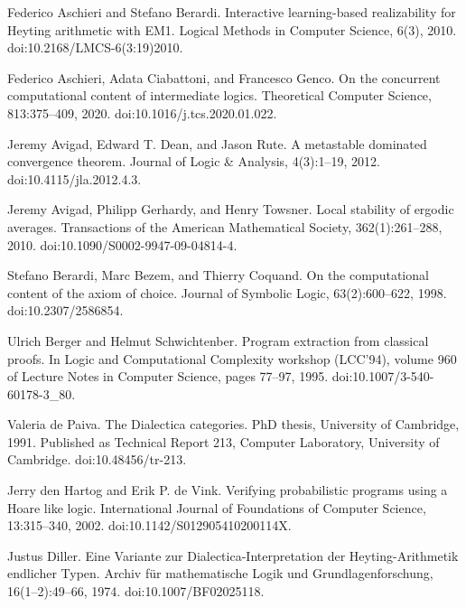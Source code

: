 \documentclass[10pt,a4paper]{article}
\begin{document}
\par\noindent  [2]  Federico Aschieri and Stefano Berardi.  Interactive learning-based realizability for Heyting arithmetic with EM1.  Logical Methods in Computer Science, 6(3), 2010.  doi:10.2168/LMCS-6(3:19)2010.  
 
\par\noindent  [3]  Federico Aschieri, Adata Ciabattoni, and Francesco Genco.  On the concurrent computational content of intermediate logics.  Theoretical Computer Science, 813:375–409, 2020.  doi:10.1016/j.tcs.2020.01.022.  
 
\par\noindent  [4]  Jeremy Avigad, Edward T. Dean, and Jason Rute.  A metastable dominated convergence theorem.  Journal of Logic \& Analysis, 4(3):1–19, 2012.  doi:10.4115/jla.2012.4.3.  
 
\par\noindent  [5]  Jeremy Avigad, Philipp Gerhardy, and Henry Towsner.  Local stability of ergodic averages.  Transactions of the American Mathematical Society, 362(1):261–288, 2010.  doi:10.1090/S0002-9947-09-04814-4.  
 
\par\noindent  [6]  Stefano Berardi, Marc Bezem, and Thierry Coquand.  On the computational content of the axiom of choice.  Journal of Symbolic Logic, 63(2):600–622, 1998.  doi:10.2307/2586854.  
 
\par\noindent  [7]  Ulrich Berger and Helmut Schwichtenber.  Program extraction from classical proofs.  In Logic and Computational Complexity workshop (LCC’94), volume 960 of Lecture Notes in Computer Science, pages 77–97, 1995.  doi:10.1007/3-540-60178-3\_80.  
 
\par\noindent  [8]  Valeria de Paiva.  The Dialectica categories.  PhD thesis, University of Cambridge, 1991.  Published as Technical Report 213, Computer Laboratory, University of Cambridge.  doi:10.48456/tr-213.  
 
\par\noindent  [9]  Jerry den Hartog and Erik P. de Vink.  Verifying probabilistic programs using a Hoare like logic.  International Journal of Foundations of Computer Science, 13:315–340, 2002.  doi:10.1142/S012905410200114X.  
 
\par\noindent  [10]  Justus Diller.  Eine Variante zur Dialectica-Interpretation der Heyting-Arithmetik endlicher Typen.  Archiv für mathematische Logik und Grundlagenforschung, 16(1–2):49–66, 1974.  doi:10.1007/BF02025118.  
 
\end{document}
